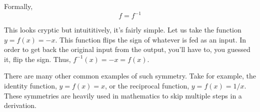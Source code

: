 Formally,
\begin{equation}
    f = f^{-1}
\end{equation}

This looks cryptic but intuititively, it's fairly simple. Let us take the function $y = f(x) = -x$. This function flips the sign of whatever is fed as an input. In order to get back the original input from the output, you'll have to, you guessed it, flip the sign. Thus, $f^{-1}(x) = -x = f(x)$.

There are many other common examples of such symmetry. Take for example, the identity function, $y = f(x) = x$, or the reciprocal function, $y = f(x) = 1/x$. These symmetries are heavily used in mathematics to skip multiple steps in a derivation.

